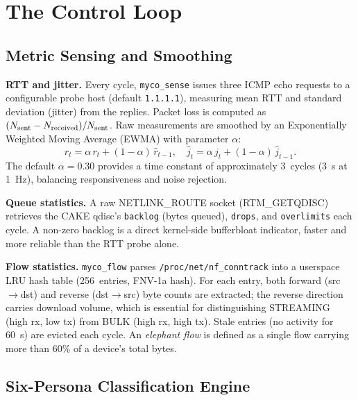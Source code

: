 \documentclass[conference]{IEEEtran}
\begin{document}
\section{The Control Loop}
\label{sec:control}

\subsection{Metric Sensing and Smoothing}

\textbf{RTT and jitter.}
Every cycle, \texttt{myco\_sense} issues three ICMP echo requests to a
configurable probe host (default \texttt{1.1.1.1}), measuring mean RTT
and standard deviation (jitter) from the replies.
Packet loss is computed as $(N_{\rm sent} - N_{\rm received})/N_{\rm sent}$.
Raw measurements are smoothed by an Exponentially Weighted Moving Average
(EWMA) with parameter $\alpha$:
\begin{equation}
  \hat{r}_t = \alpha\, r_t + (1-\alpha)\,\hat{r}_{t-1}, \quad
  \hat{j}_t = \alpha\, j_t + (1-\alpha)\,\hat{j}_{t-1}.
  \label{eq:ewma}
\end{equation}
The default $\alpha = 0.30$ provides a time constant of approximately
3~cycles (3~s at 1~Hz), balancing responsiveness and noise rejection.

\textbf{Queue statistics.}
A raw NETLINK\_ROUTE socket (RTM\_GETQDISC) retrieves the CAKE qdisc's
\texttt{backlog} (bytes queued), \texttt{drops}, and \texttt{overlimits}
each cycle.
A non-zero backlog is a direct kernel-side bufferbloat indicator,
faster and more reliable than the RTT probe alone.

\textbf{Flow statistics.}
\texttt{myco\_flow} parses \texttt{/proc/net/nf\_conntrack} into a
userspace LRU hash table (256~entries, FNV-1a hash).
For each entry, both forward (src$\to$dst) and reverse (dst$\to$src) byte
counts are extracted; the reverse direction carries download volume,
which is essential for distinguishing STREAMING (high rx, low tx) from BULK
(high rx, high tx).
Stale entries (no activity for 60~s) are evicted each cycle.
An \emph{elephant flow} is defined as a single flow carrying more than 60\%
of a device's total bytes.

\subsection{Six-Persona Classification Engine}
\end{document}
